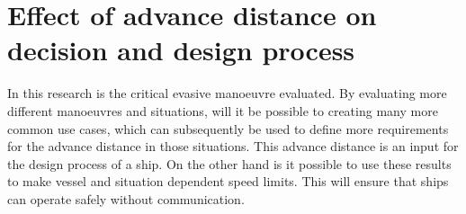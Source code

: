 

\section{Effect of advance distance on decision and design process}
In this research is the critical evasive manoeuvre evaluated. By evaluating more different manoeuvres and situations, will it be possible to creating many more common use cases, which can subsequently be used to define more requirements for the advance distance in those situations. This advance distance is an input for the design process of a ship. On the other hand is it possible to use these results to make vessel and situation dependent speed limits. This will ensure that ships can operate safely without communication.





